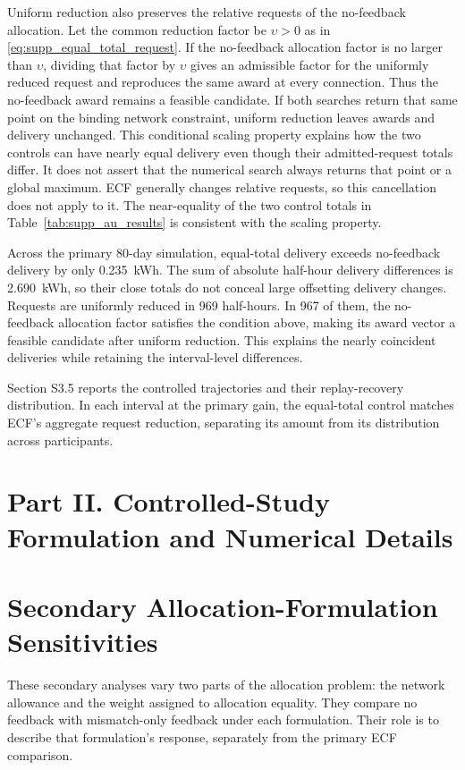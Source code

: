 \documentclass[11pt]{article}
\begin{document}
Uniform reduction also preserves the relative requests of the no-feedback
allocation. Let the common reduction factor be $\upsilon>0$ as in
\eqref{eq:supp_equal_total_request}. If the no-feedback allocation factor is
no larger than $\upsilon$, dividing that factor by $\upsilon$ gives an
admissible factor for the uniformly reduced request and reproduces the same
award at every connection. Thus the no-feedback award remains a feasible
candidate. If both searches return that same point on the binding network
constraint, uniform reduction leaves awards and delivery unchanged. This
conditional scaling property explains how the two controls can have nearly
equal delivery even though their admitted-request totals differ. It does not
assert that the numerical search always returns that point or a global maximum.
ECF generally changes relative requests, so this cancellation does not apply
to it. The near-equality of the two control totals in
Table~\ref{tab:supp_au_results} is consistent with the scaling property.

Across the primary 80-day simulation, equal-total delivery exceeds no-feedback
delivery by only 0.235~kWh. The sum of absolute half-hour delivery differences
is 2.690~kWh, so their close totals do not conceal large offsetting delivery
changes. Requests are uniformly reduced in 969 half-hours. In 967 of them,
the no-feedback allocation factor satisfies the condition above, making its
award vector a feasible candidate after uniform reduction. This explains the
nearly coincident deliveries while retaining the interval-level differences.

Section S3.5 reports the controlled trajectories and their replay-recovery
distribution. In each interval at the primary gain, the equal-total control
matches ECF's aggregate request reduction, separating its amount from its
distribution across participants.

\section*{Part II. Controlled-Study Formulation and Numerical Details}

\section{Secondary Allocation-Formulation Sensitivities}
\label{supp:dynamic_parameter_boundaries}

These secondary analyses vary two parts of the allocation problem: the network
allowance and the weight assigned to allocation equality. They compare
no feedback with mismatch-only feedback under each formulation. Their role is
to describe that formulation's response, separately from the primary ECF
comparison.
\end{document}
